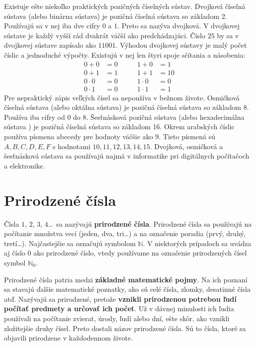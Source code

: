 \documentclass{report}
\begin{document}
Existuje ešte niekoľko praktických pozičných číselných sústav. Dvojková číselná sústava (alebo binárna sústava) je pozičná číselná sústava so základom 2. Používajú sa v nej iba dve cifry \(0\) a \(1\). Preto sa nazýva dvojková. V dvojkovej sústave je každý vyšší rád dvakrát väčší ako predchádzajúci. Číslo \(25\) by sa v dvojkovej sústave zapísalo ako \(11001\). Výhodou dvojkovej sústavy je malý počet číslic a jednoduché výpočty. Existujú v nej len štyri spoje sčítania a násobenia:
\[
\begin{aligned}
0+0 &= 0 &\qquad 1+0 &= 1 \\
0+1 &= 1 &\qquad 1+1 &= 10 \\[4pt]
0\cdot0 &= 0 &\qquad 1\cdot0 &= 0 \\
0\cdot1 &= 0 &\qquad 1\cdot1 &= 1
\end{aligned}
\]
Pre nepraktický zápis veľkých čísel sa nepoužíva v bežnom živote. Osmičková číselná sústava (alebo oktálna sústava) je pozičná číselná sústava so základom 8. Používa iba cifry od \(0\) do \(8\). Šesťnásková pozičná sústava (alebo hexadecimálna sústava ) je pozičná číselná sústava so základom 16. Okrem arabských číslic používa písmena abecedy pre hodnoty väčšie ako \(9\). Tieto písmená sú \(A, B, C, D, E, F\) s hodnotami \(10, 11, 12, 13, 14, 15\). Dvojková, osmičková a šesťnásková sústava sa používajú najmä v informatike pri digitálnych počítačoch a elektronike.

\chapter{Prirodzené čísla}

Čísla $1$, $2$, $3$, $4$\dots\ sa nazývajú \textbf{prirodzené čísla}. Prirodzené čísla sa používajú na počítanie množstva vecí (jeden, dva, tri\dots) a na označenie poradia (prvý, druhý, tretí\dots). Najčastejšie sa označujú symbolom $\mathbb{N}$. V niektorých prípadoch sa uvádza aj číslo $0$ ako prirodzené číslo, vtedy používame na označenie prirodzených čísel symbol $\mathbb{N}_0$.

Prirodzené čísla patria medzi \textbf{základné matematické pojmy}. Na ich poznaní sa stavajú ďalšie matematické poznatky, ako sú celé čísla, zlomky, desatinné čísla atď. Nazývajú sa prirodzené, pretože \textbf{vznikli prirodzenou potrebou ľudí počítať predmety a určovať ich počet}. Už v dávnej minulosti ich ľudia používali na počítanie zvierat, úrody, ľudí alebo dní, ešte skôr, ako vznikli zložitejšie druhy čísel. Preto dostali názov prirodzené čísla. Sú to čísla, ktoré sa objavili prirodzene v každodennom živote.
\end{document}
